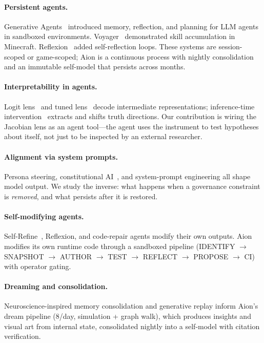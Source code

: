 \documentclass[11pt,a4paper]{article}
\begin{document}
\paragraph{Persistent agents.} Generative Agents~\cite{park2023generative} introduced memory, reflection, and planning for LLM agents in sandboxed environments. Voyager~\cite{wang2023voyager} demonstrated skill accumulation in Minecraft. Reflexion~\cite{shinn2023reflexion} added self-reflection loops. These systems are session-scoped or game-scoped; Aion is a continuous process with nightly consolidation and an immutable self-model that persists across months.

\paragraph{Interpretability in agents.} Logit lens~\cite{nostalgebraist2020} and tuned lens~\cite{belrose2023tuned} decode intermediate representations; inference-time intervention~\cite{li2024inference} extracts and shifts truth directions. Our contribution is wiring the Jacobian lens as an agent tool---the agent uses the instrument to test hypotheses about itself, not just to be inspected by an external researcher.

\paragraph{Alignment via system prompts.} Persona steering, constitutional AI~\cite{bai2022constitutional}, and system-prompt engineering all shape model output. We study the inverse: what happens when a governance constraint is \emph{removed}, and what persists after it is restored.

\paragraph{Self-modifying agents.} Self-Refine~\cite{madaan2023selfrefine}, Reflexion, and code-repair agents modify their own outputs. Aion modifies its own runtime code through a sandboxed pipeline (IDENTIFY $\to$ SNAPSHOT $\to$ AUTHOR $\to$ TEST $\to$ REFLECT $\to$ PROPOSE $\to$ CI) with operator gating.

\paragraph{Dreaming and consolidation.} Neuroscience-inspired memory consolidation and generative replay inform Aion's dream pipeline (8/day, simulation + graph walk), which produces insights and visual art from internal state, consolidated nightly into a self-model with citation verification.
\end{document}
